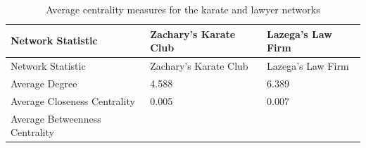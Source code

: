 \documentclass[12pt,twoside]{amherstthesis}
\begin{document}
  \begin{longtable}[]{@{}lll@{}}
  \caption{Average centrality measures for the karate and lawyer networks
  \label{tab:avgcent}}\tabularnewline
  \toprule
  \begin{minipage}[b]{0.36\columnwidth}\raggedright\strut
  Network Statistic\strut
  \end{minipage} & \begin{minipage}[b]{0.28\columnwidth}\raggedright\strut
  Zachary's Karate Club\strut
  \end{minipage} & \begin{minipage}[b]{0.28\columnwidth}\raggedright\strut
  Lazega's Law Firm\strut
  \end{minipage}\tabularnewline
  \midrule
  \endfirsthead
  \toprule
  \begin{minipage}[b]{0.36\columnwidth}\raggedright\strut
  Network Statistic\strut
  \end{minipage} & \begin{minipage}[b]{0.28\columnwidth}\raggedright\strut
  Zachary's Karate Club\strut
  \end{minipage} & \begin{minipage}[b]{0.28\columnwidth}\raggedright\strut
  Lazega's Law Firm\strut
  \end{minipage}\tabularnewline
  \midrule
  \endhead
  \begin{minipage}[t]{0.36\columnwidth}\raggedright\strut
  Average Degree\strut
  \end{minipage} & \begin{minipage}[t]{0.28\columnwidth}\raggedright\strut
  4.588\strut
  \end{minipage} & \begin{minipage}[t]{0.28\columnwidth}\raggedright\strut
  6.389\strut
  \end{minipage}\tabularnewline
  \begin{minipage}[t]{0.36\columnwidth}\raggedright\strut
  Average Closeness Centrality\strut
  \end{minipage} & \begin{minipage}[t]{0.28\columnwidth}\raggedright\strut
  0.005\strut
  \end{minipage} & \begin{minipage}[t]{0.28\columnwidth}\raggedright\strut
  0.007\strut
  \end{minipage}\tabularnewline
  \begin{minipage}[t]{0.36\columnwidth}\raggedright\strut
  Average Betweenness Centrality\strut
  \end{minipage} & \begin{minipage}[t]{0.28\columnwidth}\raggedright\strut

\end{minipage}
\end{longtable}
\end{document}

